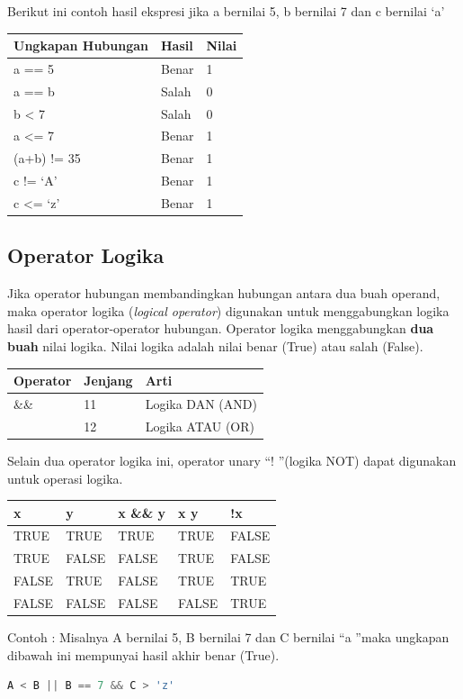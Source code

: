 Berikut ini contoh hasil ekspresi jika a bernilai 5, b bernilai 7 dan c
bernilai `a'

\begin{longtable}[]{@{}lll@{}}
\toprule
Ungkapan Hubungan & Hasil & Nilai\tabularnewline
\midrule
\endhead
a == 5 & Benar & 1\tabularnewline
a == b & Salah & 0\tabularnewline
b \textless{} 7 & Salah & 0\tabularnewline
a \textless{}= 7 & Benar & 1\tabularnewline
(a+b) != 35 & Benar & 1\tabularnewline
c != `A' & Benar & 1\tabularnewline
c \textless{}= `z' & Benar & 1\tabularnewline
\bottomrule
\end{longtable}

\subsection{Operator Logika}\label{f-operator-logika}

Jika operator hubungan membandingkan hubungan antara dua buah operand,
maka operator logika (\emph{logical operator}) digunakan untuk
menggabungkan logika hasil dari operator-operator hubungan. Operator
logika menggabungkan \textbf{dua buah} nilai logika. Nilai logika adalah
nilai benar (True) atau salah (False).

\begin{longtable}[]{@{}lll@{}}
\toprule
Operator & Jenjang & Arti\tabularnewline
\midrule
\endhead
\&\& & 11 & Logika DAN (AND)\tabularnewline
\texttt{\textbar{}\textbar{}} & 12 & Logika ATAU (OR)\tabularnewline
\bottomrule
\end{longtable}

Selain dua operator logika ini, operator unary \textquotedblleft ! \textquotedblright (logika NOT) dapat digunakan untuk operasi logika.

\begin{longtable}[]{@{}lllll@{}}
\toprule
x & y & x \&\& y & x \texttt{\textbar{}\textbar{}} y & !x\tabularnewline
\midrule
\endhead
TRUE & TRUE & TRUE & TRUE & FALSE\tabularnewline
TRUE & FALSE & FALSE & TRUE & FALSE\tabularnewline
FALSE & TRUE & FALSE & TRUE & TRUE\tabularnewline
FALSE & FALSE & FALSE & FALSE & TRUE\tabularnewline
\bottomrule
\end{longtable}

Contoh : Misalnya A bernilai 5, B bernilai 7 dan C bernilai \textquotedblleft a \textquotedblright maka ungkapan dibawah ini mempunyai hasil akhir benar (True).

\begin{lstlisting}[language=c++, numbers=none]
A < B || B == 7 && C > 'z'
\end{lstlisting}

